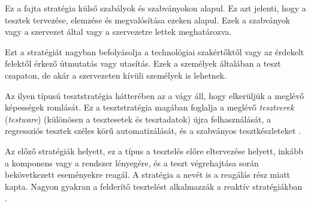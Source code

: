 
Ez a fajta stratégia külső szabályok és szabványokon alapul. Ez azt jelenti, hogy a tesztek tervezése, elemzése és megvalósítása ezeken alapul. Ezek a szabványok vagy a szervezet által vagy a szervezetre lettek meghatározva.


Ezt a stratégiát nagyban befolyásolja a technológiai szakértőktől vagy az érdekelt felektől érkező útmutatás vagy utasítás. Ezek a személyek általában a teszt csapaton, de akár a szervezeten kívüli személyek is lehetnek.


Az ilyen típusú tesztstratégia hátterében az a vágy áll, hogy elkerüljük a meglévő képességek romlását. Ez a tesztstratégia magában foglalja a meglévő \textit{tesztverek} (\textit{testware}) (különösen a tesztesetek és tesztadatok) újra felhasználását, a regressziós tesztek széles körű automatizálását, és a szabványos tesztkészleteket \cite[~68. oldal]{syllabus}.


Az előző stratégiák helyett, ez a típus a tesztelés előre eltervezése helyett, inkább a komponens vagy a rendszer lényegére, és a teszt végrehajtása során bekövetkezett eseményekre reagál. A stratégia a nevét is a reagálás rész miatt kapta. Nagyon gyakran a felderítő tesztelést alkalmazzák a reaktív stratégiákban \cite[~68. oldal]{syllabus}.

